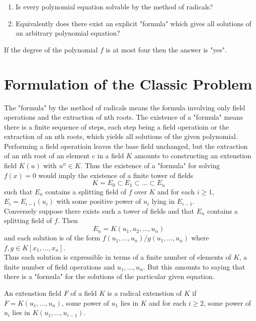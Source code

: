 
\begin{enumerate}
\item Is every polynomial equation solvable by the method of radicals?
\item Equivalently does there exist an explicit "formula" which gives all solutions of an arbitrary polynomial equation?
\end{enumerate}

If the degree of  the polynomial \(f\) is at most four then the answer is "yes".

\section{Formulation of the Classic Problem}
The "formula" by the method of radicals means the formula involving only field operations and the extraction of nth roots. 
The existence of a "formula" means there is a finite sequence of steps, each step being a field operatioin or the extraction of an nth roots, which yields all solutions of the given polynomial. 
Performing a field operatioin leaves the base field unchanged, but the extraction of an nth root of an element 
\(c\) in a field \(K\) amounts to constructing an extenstion field \(K(u)\) with \(u^n \in K\). Thus the existence of a "formula" for solving \(f(x)=0\) would imply 
the existence of a finite tower of fields \\
\[K=E_0 \subset E_1 \subset ... \subset E_n\]
such that \(E_n\) contains a splitting field of \(f\) over \(K\) and for each \(i \geq 1\), \(E_i=E_{i-1}(u_i)\) with some positive power of \(u_i\) lying in \(E_{i-1}\).\\

Conversely suppose there exists such a tower of fields and that \(E_n\) contains a splitting field of \(f\). Then 
\[E_n = K(u_1,u_2,...,u_n)\]
and each solution is of the form \(f(u_1,...,u_n)/g(u_1,...,u_n)\) where \(f,g \in K[x_1,...,x_n]\). \\
Thus each solution is expressible in terms of a finite number of elements of \(K\), a finite number of field operations and \(u_1,...,u_n\). But 
this amounts to saying that there is a "formula" for the solutions of the particular given equation. \\

\begin{definition}
An extenstion field \(F\) of a field \(K\) is a radical extenstion of \(K\) if \(F=K(u_1,...,u_n)\), some power of \(u_1\) lies in \(K\) and for each \(i \geq 2\), some power of \(u_i\) lies in \(K(u_1,...,u_{i-1})\).
\end{definition}


